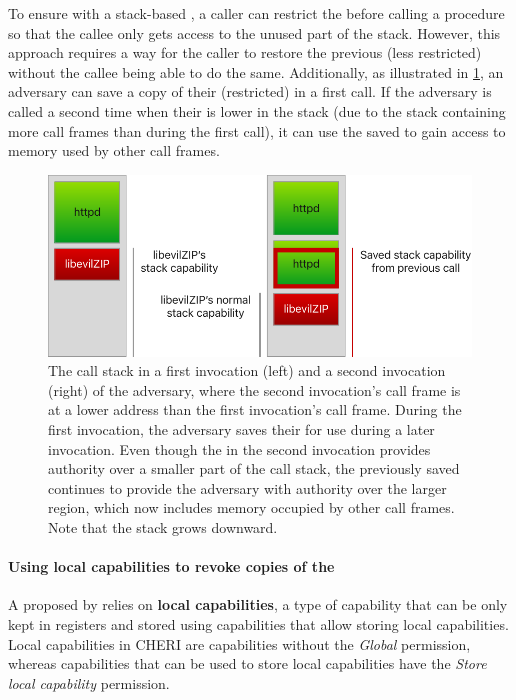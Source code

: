 \documentclass[main.tex]{subfiles}
\begin{document}
To ensure  with a stack-based , a caller can restrict the  before calling a procedure so that the callee only gets access to the unused part of the stack. However, this approach requires a way for the caller to restore the previous (less restricted)  without the callee being able to do the same. Additionally, as illustrated in \cref{fig:savedstackcap}, an adversary can save a copy of their (restricted)  in a first call. If the adversary is called a second time when their  is lower in the stack (due to the stack containing more call frames than during the first call), it can use the saved  to gain access to memory used by other call frames.

\begin{figure}
	\begin{center}
		\includegraphics{Images/Saved Stack Cap.pdf}
	\end{center}
	\caption{The call stack in a first invocation (left) and a second invocation (right) of the adversary, where the second invocation's call frame is at a lower address than the first invocation's call frame. During the first invocation, the adversary saves their  for use during a later invocation. Even though the  in the second invocation provides authority over a smaller part of the call stack, the previously saved  continues to provide the adversary with authority over the larger region, which now includes memory occupied by other call frames. Note that the stack grows downward.}
	\label{fig:savedstackcap}
\end{figure}

\paragraph{Using local capabilities to revoke copies of the } A  proposed by \cite{retptr} relies on \textbf{local capabilities}, a type of capability that can be only kept in registers and stored using capabilities that allow storing local capabilities. Local capabilities in CHERI are capabilities without the \emph{Global} permission, whereas capabilities that can be used to store local capabilities have the \emph{Store local capability} permission.
\end{document}
